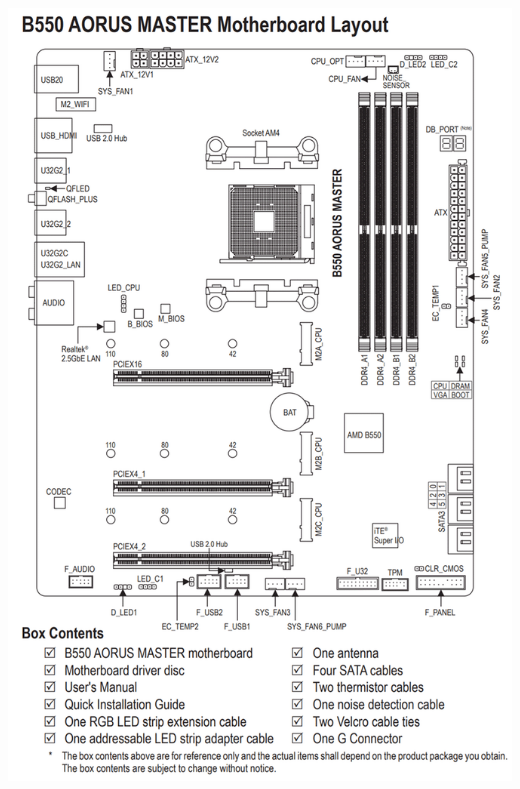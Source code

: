 \documentclass{article}
\begin{document}
\begin{itemize}
        \begin{minipage}{\textwidth}
          \includegraphics[scale=0.25]{img/B550AORUSMasterDiagram.png}
        \end{minipage}
      \end{itemize}

  \newpage
\end{document}
